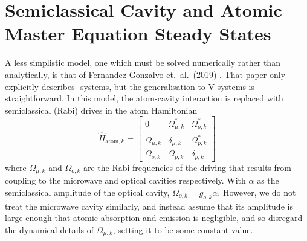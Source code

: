\section{Semiclassical Cavity and Atomic Master Equation Steady States}
A less simplistic model, one which must be solved numerically rather than analytically, is that of Fernandez-Gonzalvo et.\ al.\ (2019) \cite{fernandez-gonzalvo_2019}. That paper only explicitly describes \textLambda-systems, but the generalisation to V-systems is straightforward. In this model, the atom-cavity interaction is replaced with semiclassical (Rabi) drives in the atom Hamiltonian
\begin{equation}
    \hat{H}_{\text{atom},k} =
    \begin{bmatrix}
        0 & \Omega_{\mu,k}^* & \Omega_{o,k}^*\\
        \Omega_{\mu,k} & \delta_{\mu,k} & \Omega_{p,k}^*\\
        \Omega_{o,k} & \Omega_{p,k} & \delta_{p,k}
    \end{bmatrix}
\end{equation}
where $\Omega_{\mu,k}$ and $\Omega_{o,k}$ are the Rabi frequencies of the driving that results from coupling to the microwave and optical cavities respectively. With $\alpha$ as the semiclassical amplitude of the optical cavity, $\Omega_{o,k} = g_{o,k}\alpha$. However, we do not treat the microwave cavity similarly, and instead assume that its amplitude is large enough that atomic absorption and emission is negligible, and so disregard the dynamical details of $\Omega_{\mu,k}$, setting it to be some constant value.

